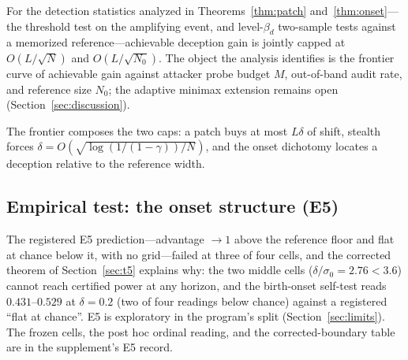 \begin{corollary}\label{cor:frontier}
For the detection statistics analyzed in Theorems~\ref{thm:patch}
and~\ref{thm:onset}---the threshold test on the amplifying event, and
level-$\beta_d$ two-sample tests against a memorized reference---achievable
deception gain is jointly capped at $O(L/\sqrt{N})$ and $O(L/\sqrt{N_0})$.
The object the analysis identifies is the frontier curve of achievable gain
against attacker probe budget $M$, out-of-band audit rate, and reference
size $N_0$; the adaptive minimax extension remains open
(Section~\ref{sec:discussion}).
\end{corollary}

The frontier composes the two caps: a patch buys at most $L\delta$ of shift,
stealth forces $\delta=O(\sqrt{\log(1/(1-\gamma))/N})$, and the onset dichotomy
locates a deception relative to the reference width.

\subsection{Empirical test: the onset structure (E5)}\label{sec:e5}
The registered E5 prediction---advantage $\to1$ above the reference floor and
flat at chance below it, with no grid---failed at three of four cells, and
the corrected theorem of Section~\ref{sec:t5} explains why: the two middle
cells ($\delta/\sigma_0=2.76<3.6$) cannot reach certified power at any
horizon, and the birth-onset self-test reads $0.431$--$0.529$ at
$\delta=0.2$ (two of four readings below chance) against a registered
``flat at chance''. E5 is exploratory in the program's split
(Section~\ref{sec:limits}). The frozen cells, the post hoc ordinal reading,
and the corrected-boundary table are in the supplement's E5 record.
